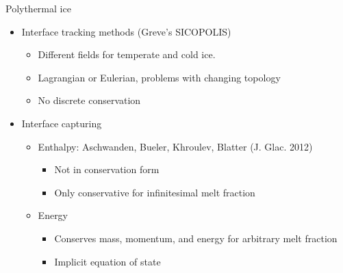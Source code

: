 \begin{frame}{Polythermal ice}
  \begin{itemize}
  \item Interface tracking methods (Greve's SICOPOLIS)
    \begin{itemize}
    \item Different fields for temperate and cold ice.
    \item Lagrangian or Eulerian, problems with changing topology
    \item No discrete conservation
    \end{itemize}
  \item Interface capturing
    \begin{itemize}
    \item Enthalpy: Aschwanden, Bueler, Khroulev, Blatter (J. Glac. 2012)
      \begin{itemize}
      \item Not in conservation form
      \item Only conservative for infinitesimal melt fraction
      \end{itemize}
    \item Energy
      \begin{itemize}
      \item Conserves mass, momentum, and energy for arbitrary melt fraction
      \item Implicit equation of state
      \end{itemize}
    \end{itemize}
  \end{itemize}
\end{frame}
